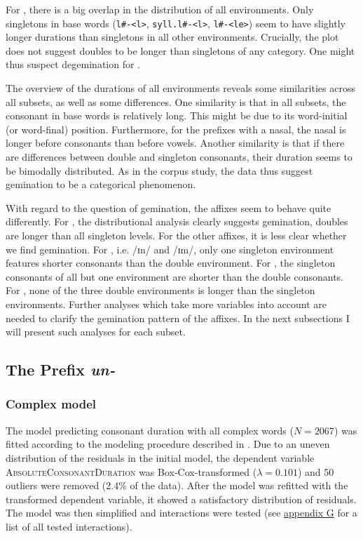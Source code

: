 
For , there is a big overlap in the distribution of all environments. Only singletons in base words (\texttt{l\#-<l>}, \texttt{syll.l\#-<l>}, \texttt{l\#-<le>}) seem to have slightly longer durations than singletons in all other environments. Crucially, the plot does not suggest doubles to be longer than singletons of any category. One might thus suspect degemination for . 

The overview of the durations of all environments reveals some similarities across all subsets, as well as some differences. 
One similarity is that in all subsets, the consonant in base words is relatively long. This might be due to its word-initial (or word-final) position. 
Furthermore, for the prefixes with a nasal, the nasal is longer before consonants than before vowels. 
Another similarity is that if there are differences between double and singleton consonants, their duration seems to be bimodally distributed. As in the corpus study, the data thus suggest gemination to be a categorical phenomenon.

With regard to the question of gemination, the affixes seem to behave quite differently. For , the distributional analysis clearly suggests gemination, doubles are longer than all singleton levels. 
For the other affixes, it is less clear whether we find gemination. For , i.e. /ɪn/ and /ɪm/, only one singleton environment features shorter consonants than the double environment.
For , the singleton consonants of all but one environment are shorter than the double consonants. 
For , none of the three double environments is longer than the singleton environments. Further analyses which take more variables into account are needed to clarify the gemination pattern of the affixes. 
 In the next subsections I will present such analyses for each subset.


\subsection{The Prefix \textit{un-}} \label{un experiment}

\subsubsection{Complex model}


The model predicting consonant duration with all complex words ($N=2067$) was fitted according to the modeling procedure described in . Due to an uneven distribution of the residuals in the initial model, the dependent variable \textsc{AbsoluteConsonantDuration} was Box-Cox-transformed ($\lambda = 0.101$) and 50 outliers were removed (2.4\% of the data).
 After the model was refitted with the transformed dependent variable, it showed a satisfactory distribution of residuals.  The model was then simplified and interactions were tested (see \hyperref[Appendix G Summaries of tested interactions in experimental study]{appendix G} for a list of all tested interactions).
 
